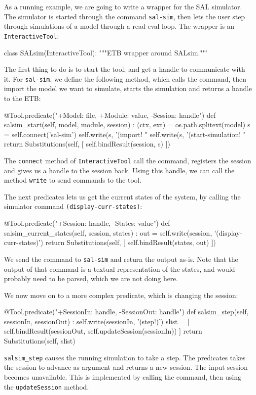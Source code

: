 \documentclass{article}
\begin{document}
As a running example, we are going to write a wrapper for the SAL
simulator. The simulator is started through the command {\tt sal-sim},
then lets the user step through simulations of a model through a
read-eval loop. The wrapper is an {\tt InteractiveTool}:
\begin{pythoncode}
class SALsim(InteractiveTool):
  """ETB wrapper around SALsim."""
\end{pythoncode}
The first thing to do is to start the tool, and get a handle to
communicate with it. For {\tt sal-sim}, we define the following
method, which calls the command, then import the model we want to
simulate, starts the simulation and returns a handle to the ETB:
\begin{pythoncode}
  @Tool.predicate("+Model: file, +Module: value, -Session: handle")
  def salsim_start(self, model, module, session) :
    (ctx, ext) = os.path.splitext(model)
    s = self.connect('sal-sim')
    self.write(s, '(import! "%
    self.write(s, '(start-simulation! "%
    return  Substitutions(self, [ self.bindResult(session, s) ])
\end{pythoncode}
The {\tt connect} method of {\tt InteractiveTool} call the command,
registers the session and gives us a handle to the session back. Using
this handle, we can call the method {\tt write} to send commands to
the tool.

The next predicates lets us get the current states of the system, by
calling the simulator command {\tt (display-curr-states)}:
\begin{pythoncode}
    @Tool.predicate("+Session: handle, -States: value")
    def salsim_current_states(self, session, states) :
        out = self.write(session, '(display-curr-states)\n')
        return  Substitutions(self, [ self.bindResult(states, out) ])
\end{pythoncode}
We send the command to {\tt sal-sim} and return the output as-is. Note
that the output of that command is a textual representation of the
states, and would probably need to be parsed, which we are not doing
here.

We now move on to a more complex predicate, which is changing the
session:
\begin{pythoncode}
    @Tool.predicate("+SessionIn: handle, -SessionOut: handle")
    def salsim_step(self, sessionIn, sessionOut) :
        self.write(sessionIn, '(step!)\n')
        slist = [ self.bindResult(sessionOut, self.updateSession(sessionIn)) ]
        return Substitutions(self, slist)
\end{pythoncode}
{\tt salsim\_step} causes the running simulation to take a step. The
predicates takes the session to advance as argument and returns a new
session. The input session becomes unavailable. This is implemented by
calling the command, then using the {\tt updateSession} method.
\end{document}
